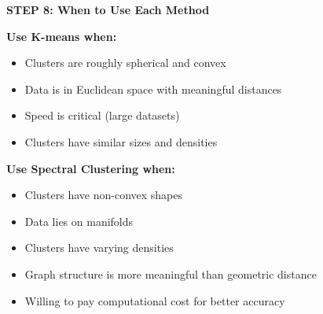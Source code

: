 \documentclass[12pt]{article}
\begin{document}
\begin{solution}
\textbf{STEP 8: When to Use Each Method}

\textbf{Use K-means when:}
\begin{itemize}
    \item Clusters are roughly spherical and convex
    \item Data is in Euclidean space with meaningful distances
    \item Speed is critical (large datasets)
    \item Clusters have similar sizes and densities
\end{itemize}

\textbf{Use Spectral Clustering when:}
\begin{itemize}
    \item Clusters have non-convex shapes
    \item Data lies on manifolds
    \item Clusters have varying densities
    \item Graph structure is more meaningful than geometric distance
    \item Willing to pay computational cost for better accuracy
\end{itemize}

\end{solution}
\end{document}
